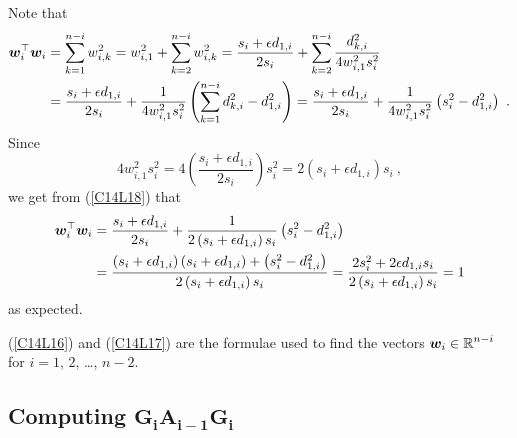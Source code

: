 Note that
\begin{align}
\VEC{w}_i^\top\VEC{w}_i &= \sum_{k=1}^{n-i} w_{i,k}^2
= w_{i,1}^2 + \sum_{k=2}^{n-i} w_{i,k}^2
= \frac{s_i + \epsilon d_{1,i}}{2s_i} + \sum_{k=2}^{n-i}
\frac{d_{k,i}^2}{4 w_{i,1}^2 s_i^2} \nonumber \\
&= \frac{s_i + \epsilon d_{1,i}}{2s_i} +
\frac{1}{4 w_{i,1}^2 s_i^2}\left(\sum_{k=1}^{n-i} d_{k,i}^2
- d_{1,i}^2\right)
= \frac{s_i + \epsilon d_{1,i}}{2s_i} +
\frac{1}{4 w_{i,1}^2 s_i^2}\left(s_i^2- d_{1,i}^2\right) \ .  \label{C14L18}
\end{align}
Since
\[
4 w_{i,1}^2 s_i^2 = 4 \left(\frac{s_i + \epsilon d_{1,i}}{2s_i}\right)
s_i^2 = 2\left( s_i + \epsilon d_{1,i}\right)s_i \ ,
\]
we get from (\ref{C14L18}) that
\begin{align*}
\bm{w}_i^\top\bm{w}_i &= \frac{s_i + \epsilon d_{1,i}}{2s_i}
+ \frac{1}{2\left( s_i + \epsilon d_{1,i}\right)s_i}
\left(s_i^2- d_{1,i}^2\right) \\
&= \frac{\left(s_i + \epsilon d_{1,i}\right)
\left( s_i + \epsilon d_{1,i}\right) + \left(s_i^2- d_{1,i}^2\right)}
{2\left( s_i + \epsilon d_{1,i}\right)s_i}
= \frac{2 s_i^2 + 2 \epsilon d_{1,i} s_i}
{2\left( s_i + \epsilon d_{1,i}\right)s_i} = 1
\end{align*}
as expected.

(\ref{C14L16}) and (\ref{C14L17}) are the formulae used to find
the vectors $\displaystyle \bm{w}_i \in \mathbb{R}^{n-i}$ for
$i=1$, $2$, \ldots, $n-2$.

\subsection{Computing $\mathbf{G_i A_{i-1} G_i}$}

